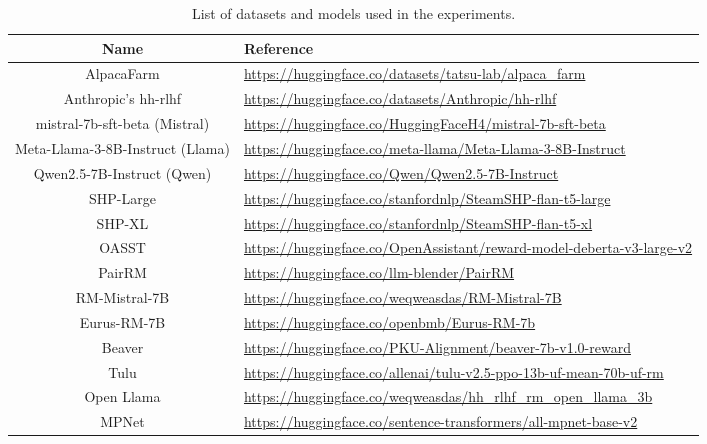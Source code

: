 \begin{table*}
    \caption{List of datasets and models used in the experiments.}
    \label{tab:links}
    \centering
    \begin{tabularx}{\textwidth}{cX}
    \toprule
        Name & Reference \\
    \midrule
        AlpacaFarm & \cite{NEURIPS2023_5fc47800} \url{https://huggingface.co/datasets/tatsu-lab/alpaca_farm} \\\midrule
        Anthropic's hh-rlhf & \cite{bai2022training} \url{https://huggingface.co/datasets/Anthropic/hh-rlhf} \\\midrule
        mistral-7b-sft-beta (Mistral) & \cite{jiang2023mistral,tunstall2023zephyr} \url{https://huggingface.co/HuggingFaceH4/mistral-7b-sft-beta} \\\midrule
        Meta-Llama-3-8B-Instruct  (Llama) & \cite{dubey2024llama} \url{https://huggingface.co/meta-llama/Meta-Llama-3-8B-Instruct} \\\midrule
        Qwen2.5-7B-Instruct (Qwen)& \cite{qwen2,qwen2.5} \url{https://huggingface.co/Qwen/Qwen2.5-7B-Instruct} \\\midrule
        SHP-Large & \cite{pmlr-v162-ethayarajh22a} \url{https://huggingface.co/stanfordnlp/SteamSHP-flan-t5-large} \\\midrule
        SHP-XL & \cite{pmlr-v162-ethayarajh22a} \url{https://huggingface.co/stanfordnlp/SteamSHP-flan-t5-xl} \\\midrule
        OASST & \cite{NEURIPS2023_949f0f8f} \url{https://huggingface.co/OpenAssistant/reward-model-deberta-v3-large-v2} \\\midrule
        PairRM & \cite{jiang-etal-2023-llm} \url{https://huggingface.co/llm-blender/PairRM} \\\midrule
        RM-Mistral-7B & \cite{dong2023raft} \url{https://huggingface.co/weqweasdas/RM-Mistral-7B} \\\midrule
Eurus-RM-7B & \cite{yuan2024advancing} \url{https://huggingface.co/openbmb/Eurus-RM-7b} \\\midrule
        Beaver & \cite{dai2024safe}\url{https://huggingface.co/PKU-Alignment/beaver-7b-v1.0-reward} \\\midrule
         Tulu & \cite{ivison2024unpacking} \url{https://huggingface.co/allenai/tulu-v2.5-ppo-13b-uf-mean-70b-uf-rm} \\\midrule
         Open Llama & \cite{diao-etal-2024-lmflow} \url{https://huggingface.co/weqweasdas/hh_rlhf_rm_open_llama_3b} \\\midrule
        MPNet & \cite{NEURIPS2020_c3a690be} \url{https://huggingface.co/sentence-transformers/all-mpnet-base-v2} \\
        \bottomrule
    \end{tabularx}
\end{table*}
\newpage

